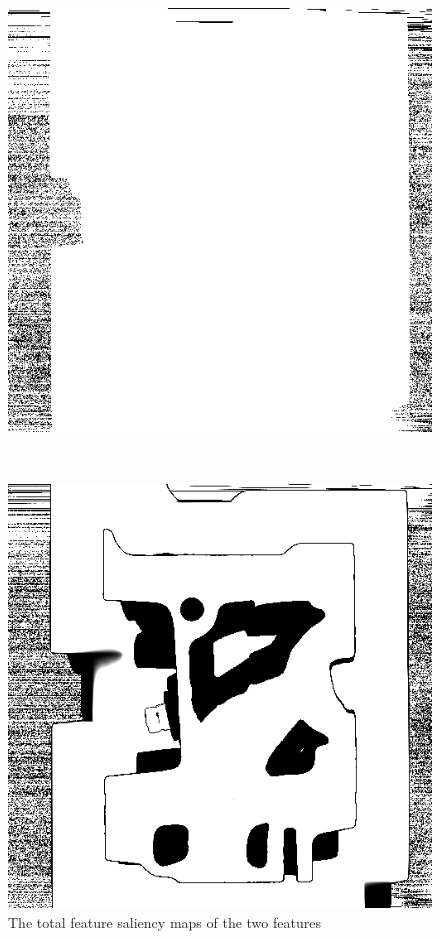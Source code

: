 \begin{figure}
	\centering
	\begin{minipage}{.33\textwidth}
		\includegraphics[width=1\linewidth]{images/engine_naive_saliencemap_1}
	\end{minipage}~
	\begin{minipage}{.33\textwidth}
		\includegraphics[width=1\linewidth]{images/engine_naive_saliencemap_2}
	\end{minipage}
	\caption{The total feature saliency maps of the two features}
	\label{fig:engine_naive_saliencemap_features}
\end{figure}

